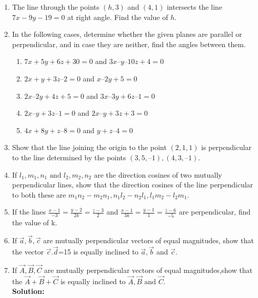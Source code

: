 \begin{enumerate}[label=\thesection.\arabic*,ref=\thesection.\theenumi]
\label{chapters/11/10/1/6}

\item The line through the points $(h, 3)$ and $(4, 1)$ intersects the line $7x- 9y- 19= 0$ at right angle. Find the value of $h$.
\label{chapters/11/10/3/10}
\\
\solution

\item In the following cases, determine whether the given planes are parallel or perpendicular, and in case they are neither, find the angles between them.
\begin{enumerate}
\item $7x + 5y + 6z + 30 = 0$ and $3x – y – 10z + 4 = 0$
\item $2x + y + 3z – 2 = 0$ and $x – 2y + 5 = 0$
\item $2x – 2y + 4z + 5 = 0$ and $3x – 3y + 6z – 1 = 0$
\item $2x – y + 3z – 1 = 0$ and $2x – y + 3z + 3 = 0$
\item $4x + 8y + z – 8 = 0$ and $y + z – 4 = 0$
\end{enumerate}
    \solution
		
		\item 
 Show that the line joining the origin to the point $(2, 1, 1)$ is perpendicular to the
line determined by the points $(3, 5, – 1), (4, 3, – 1)$.
\\
    \solution
		
	\item  If $l_1, m_1,n_1 \text{ and } l_2,m_2,n_2$ are the direction cosines of two mutually perpendicular lines, show that the direction cosines of the line perpendicular to both these are  $m_1n_2-m_2n_1,n_1l_2-n_2l_1,l_1m_2-l_2m_1$.
\\
    \solution
		
	\item If the lines $\frac{x-1}{-3} = \frac{y-2}{2k} = \frac{z-3}{2}$ and  $\frac{x-1}{3k} = \frac{y-1}{1} = \frac{z-6}{-5}$ are perpendicular, find the value of k.\\
    \solution
		
\item If $\vec{a},\vec{b},\vec{c}$ are mutually perpendicular vectors of equal magnitudes, show that the vector $\vec{c}.\vec{d}$=15 is equally inclined to $\vec{a},\vec{b}$ and $\vec{c}$.\\
    \item If $ \vec{A},\vec{B},\vec{C} $ are mutually perpendicular vectors of equal magnitudes,show that the  $ \vec{A}+\vec{B}+\vec{C} $ is equally inclined to $ \vec{A},\vec{B}  \text{ and }  \vec{C} $.\\
    \textbf{Solution:}
    

\end{enumerate}
